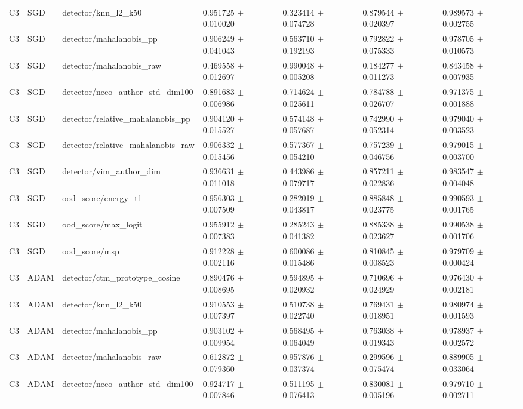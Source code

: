 \begin{longtable}{lllllll}
C3 & SGD & detector/knn\_l2\_k50 & 0.951725 $\pm$ 0.010020 & 0.323414 $\pm$ 0.074728 & 0.879544 $\pm$ 0.020397 & 0.989573 $\pm$ 0.002755 \\
C3 & SGD & detector/mahalanobis\_pp & 0.906249 $\pm$ 0.041043 & 0.563710 $\pm$ 0.192193 & 0.792822 $\pm$ 0.075333 & 0.978705 $\pm$ 0.010573 \\
C3 & SGD & detector/mahalanobis\_raw & 0.469558 $\pm$ 0.012697 & 0.990048 $\pm$ 0.005208 & 0.184277 $\pm$ 0.011273 & 0.843458 $\pm$ 0.007935 \\
C3 & SGD & detector/neco\_author\_std\_dim100 & 0.891683 $\pm$ 0.006986 & 0.714624 $\pm$ 0.025611 & 0.784788 $\pm$ 0.026707 & 0.971375 $\pm$ 0.001888 \\
C3 & SGD & detector/relative\_mahalanobis\_pp & 0.904120 $\pm$ 0.015527 & 0.574148 $\pm$ 0.057687 & 0.742990 $\pm$ 0.052314 & 0.979040 $\pm$ 0.003523 \\
C3 & SGD & detector/relative\_mahalanobis\_raw & 0.906332 $\pm$ 0.015456 & 0.577367 $\pm$ 0.054210 & 0.757239 $\pm$ 0.046756 & 0.979015 $\pm$ 0.003700 \\
C3 & SGD & detector/vim\_author\_dim & 0.936631 $\pm$ 0.011018 & 0.443986 $\pm$ 0.079717 & 0.857211 $\pm$ 0.022836 & 0.983547 $\pm$ 0.004048 \\
C3 & SGD & ood\_score/energy\_t1 & 0.956303 $\pm$ 0.007509 & 0.282019 $\pm$ 0.043817 & 0.885848 $\pm$ 0.023775 & 0.990593 $\pm$ 0.001765 \\
C3 & SGD & ood\_score/max\_logit & 0.955912 $\pm$ 0.007383 & 0.285243 $\pm$ 0.041382 & 0.885338 $\pm$ 0.023627 & 0.990538 $\pm$ 0.001706 \\
C3 & SGD & ood\_score/msp & 0.912228 $\pm$ 0.002116 & 0.600086 $\pm$ 0.015486 & 0.810845 $\pm$ 0.008523 & 0.979709 $\pm$ 0.000424 \\
C3 & ADAM & detector/ctm\_prototype\_cosine & 0.890476 $\pm$ 0.008695 & 0.594895 $\pm$ 0.020932 & 0.710696 $\pm$ 0.024929 & 0.976430 $\pm$ 0.002181 \\
C3 & ADAM & detector/knn\_l2\_k50 & 0.910553 $\pm$ 0.007397 & 0.510738 $\pm$ 0.022740 & 0.769431 $\pm$ 0.018951 & 0.980974 $\pm$ 0.001593 \\
C3 & ADAM & detector/mahalanobis\_pp & 0.903102 $\pm$ 0.009954 & 0.568495 $\pm$ 0.064049 & 0.763038 $\pm$ 0.019343 & 0.978937 $\pm$ 0.002572 \\
C3 & ADAM & detector/mahalanobis\_raw & 0.612872 $\pm$ 0.079360 & 0.957876 $\pm$ 0.037374 & 0.299596 $\pm$ 0.075474 & 0.889905 $\pm$ 0.033064 \\
C3 & ADAM & detector/neco\_author\_std\_dim100 & 0.924717 $\pm$ 0.007846 & 0.511195 $\pm$ 0.076413 & 0.830081 $\pm$ 0.005196 & 0.979710 $\pm$ 0.002711 \\

\end{longtable}

